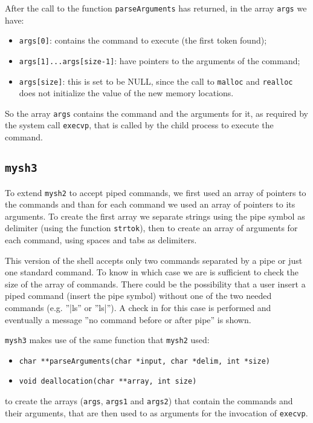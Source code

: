 After the call to the function \texttt{parseArguments} has returned, in the array \texttt{args} we have:
\begin{itemize}
\item \texttt{args[0]}: contains the command to execute (the first token found);
\item \texttt{args[1]...args[size-1]}: have pointers to the arguments of the command;
\item \texttt{args[size]}: this is set to be NULL, since the call to \texttt{malloc} and \texttt{realloc} does not initialize the value of the new memory locations.
\end{itemize}

So the array \texttt{args} contains the command and the arguments for it, as required by the system call \texttt{execvp}, that is called by the child process to execute the command.

\subsection{\texttt{mysh3}}
To extend \texttt{mysh2} to accept piped commands, we first used an array of pointers to the commands and than for each command we used an array of pointers to its arguments. To create the first array we separate strings using the pipe symbol as delimiter (using the function \texttt{strtok}), then to create an array of arguments for each command, using spaces and tabs as delimiters.  \newline

This version of the shell accepts only two commands separated by a pipe or just one standard command. To know in which case we are is sufficient to check the size of the array of commands. There could be the possibility that a user insert a piped command (insert the pipe symbol) without one of the two needed commands (e.g. ''|ls'' or ''ls|''). A check in for this case is performed and eventually a message ''no command before or after pipe'' is shown.\newline

\texttt{mysh3} makes use of the same function that \texttt{mysh2} used:
\begin{itemize}
\item{\texttt{char **parseArguments(char *input, char *delim, int *size)}}
\item{\texttt{void deallocation(char **array, int size)}}
\end{itemize}
to create the arrays (\texttt{args}, \texttt{args1} and \texttt{args2}) that contain the commands and their arguments, that are then used to as arguments for the invocation of \texttt{execvp}.



